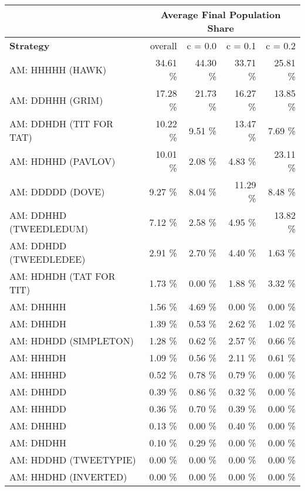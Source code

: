 \begin{tabular}{|l|r|r|r|r|}
\hline
 & \multicolumn{4}{c|}{{\bf Average Final Population Share}} \\
\hline
{\bf Strategy} & overall &  c = 0.0 & c = 0.1 & c = 0.2\\ \hline
AM: HHHHH (HAWK)             &   34.61 \%  &   44.30 \%  &   33.71 \%  &   25.81 \% \\
AM: DDHHH (GRIM)             &   17.28 \%  &   21.73 \%  &   16.27 \%  &   13.85 \% \\
AM: DDHDH (TIT FOR TAT)      &   10.22 \%  &    9.51 \%  &   13.47 \%  &    7.69 \% \\
AM: HDHHD (PAVLOV)           &   10.01 \%  &    2.08 \%  &    4.83 \%  &   23.11 \% \\
AM: DDDDD (DOVE)             &    9.27 \%  &    8.04 \%  &   11.29 \%  &    8.48 \% \\
AM: DDHHD (TWEEDLEDUM)       &    7.12 \%  &    2.58 \%  &    4.95 \%  &   13.82 \% \\
AM: DDHDD (TWEEDLEDEE)       &    2.91 \%  &    2.70 \%  &    4.40 \%  &    1.63 \% \\
AM: HDHDH (TAT FOR TIT)      &    1.73 \%  &    0.00 \%  &    1.88 \%  &    3.32 \% \\
AM: DHHHH                    &    1.56 \%  &    4.69 \%  &    0.00 \%  &    0.00 \% \\
AM: DHHDH                    &    1.39 \%  &    0.53 \%  &    2.62 \%  &    1.02 \% \\
AM: HDHDD (SIMPLETON)        &    1.28 \%  &    0.62 \%  &    2.57 \%  &    0.66 \% \\
AM: HHHDH                    &    1.09 \%  &    0.56 \%  &    2.11 \%  &    0.61 \% \\
AM: HHHHD                    &    0.52 \%  &    0.78 \%  &    0.79 \%  &    0.00 \% \\
AM: DHHDD                    &    0.39 \%  &    0.86 \%  &    0.32 \%  &    0.00 \% \\
AM: HHHDD                    &    0.36 \%  &    0.70 \%  &    0.39 \%  &    0.00 \% \\
AM: DHHHD                    &    0.13 \%  &    0.00 \%  &    0.40 \%  &    0.00 \% \\
AM: DHDHH                    &    0.10 \%  &    0.29 \%  &    0.00 \%  &    0.00 \% \\
AM: HDDHD (TWEETYPIE)        &    0.00 \%  &    0.00 \%  &    0.00 \%  &    0.00 \% \\
AM: HHDHD (INVERTED)         &    0.00 \%  &    0.00 \%  &    0.00 \%  &    0.00 \% \\

\end{tabular}
